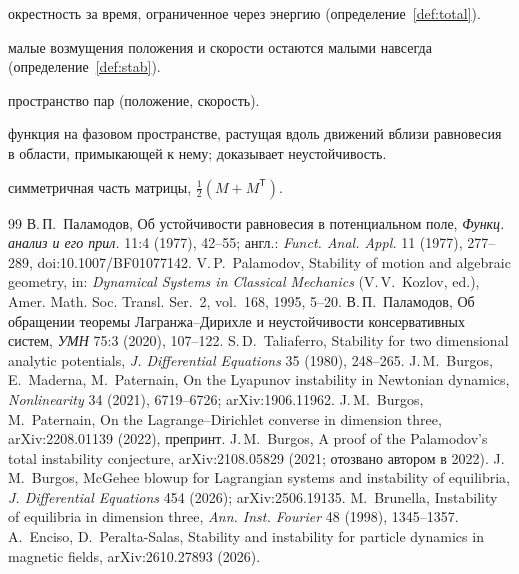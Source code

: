 \documentclass[11pt,a4paper]{article}
\theoremstyle{definition}
\newcommand{\sym}{\operatorname{sym}}
\begin{document}
\begin{description}[leftmargin=0pt,style=nextline]
окрестность за время, ограниченное через энергию (определение~\ref{def:total}).
\item[Устойчивость по Ляпунову] малые возмущения положения и скорости остаются малыми навсегда
(определение~\ref{def:stab}).
\item[Фазовое пространство] пространство пар (положение, скорость).
\item[Функция Четаева] функция на фазовом пространстве, растущая вдоль движений вблизи
равновесия в области, примыкающей к нему; доказывает неустойчивость.
\item[$\sym M$] симметричная часть матрицы, $\tfrac12(M+M^{\mathsf T})$.
\end{description}

\begin{thebibliography}{99}
 В.\,П.~Паламодов, Об устойчивости равновесия в потенциальном поле,
\emph{Функц. анализ и его прил.} 11:4 (1977), 42--55; англ.: \emph{Funct. Anal. Appl.} 11
(1977), 277--289, doi:10.1007/BF01077142.
 V.\,P.~Palamodov, Stability of motion and algebraic geometry, in:
\emph{Dynamical Systems in Classical Mechanics} (V.\,V.~Kozlov, ed.), Amer. Math. Soc. Transl.
Ser.~2, vol.~168, 1995, 5--20.
 В.\,П.~Паламодов, Об обращении теоремы Лагранжа--Дирихле и неустойчивости
консервативных систем, \emph{УМН} 75:3 (2020), 107--122.
 S.\,D.~Taliaferro, Stability for two dimensional analytic potentials,
\emph{J. Differential Equations} 35 (1980), 248--265.
 J.\,M.~Burgos, E.~Maderna, M.~Paternain, On the Lyapunov instability in
Newtonian dynamics, \emph{Nonlinearity} 34 (2021), 6719--6726; arXiv:1906.11962.
 J.\,M.~Burgos, M.~Paternain, On the Lagrange--Dirichlet converse in
dimension three, arXiv:2208.01139 (2022), препринт.
 J.\,M.~Burgos, A proof of the Palamodov's total instability conjecture,
arXiv:2108.05829 (2021; отозвано автором в 2022).
 J.\,M.~Burgos, McGehee blowup for Lagrangian systems and instability of
equilibria, \emph{J. Differential Equations} 454 (2026); arXiv:2506.19135.
 M.~Brunella, Instability of equilibria in dimension three, \emph{Ann. Inst.
Fourier} 48 (1998), 1345--1357.
 A.~Enciso, D.~Peralta-Salas, Stability and instability for particle
dynamics in magnetic fields, arXiv:2610.27893 (2026).
\end{thebibliography}
\end{document}
